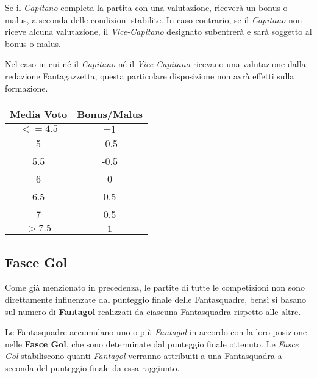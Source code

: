 \documentclass[12pt]{article}
\begin{document}
Se il \textit{Capitano} completa la partita con una valutazione, riceverà un bonus o malus, a seconda delle condizioni stabilite. In caso contrario, se il \textit{Capitano} non riceve alcuna valutazione, il \textit{Vice-Capitano} designato subentrerà e sarà soggetto al bonus o malus.

Nel caso in cui né il \textit{Capitano} né il \textit{Vice-Capitano} ricevano una valutazione dalla redazione Fantagazzetta, questa particolare disposizione non avrà effetti sulla formazione.
\newline
\\
\begin{tabular}{|c|c|}
    \hline
    \textbf{Media Voto} & \textbf{Bonus/Malus} \\
    \hline
    $ <= 4.5 $ & $ -1 $ \\
    \hline
    5 & -0.5 \\
    \hline
    5.5 & -0.5 \\
    \hline
    6 & 0 \\
    \hline
    6.5 & 0.5 \\
    \hline
    7 & 0.5 \\
    \hline
    $ > 7.5 $ & $ 1 $ \\
    \hline
  \end{tabular}
\newline 

\subsection{Fasce Gol}
Come già menzionato in precedenza, le partite di tutte le competizioni non sono direttamente influenzate dal punteggio finale delle Fantasquadre, bensì si basano sul numero di \textbf{Fantagol} realizzati da ciascuna Fantasquadra rispetto alle altre.

Le Fantasquadre accumulano uno o più \textit{Fantagol} in accordo con la loro posizione nelle \textbf{Fasce Gol}, che sono determinate dal punteggio finale ottenuto. Le \textit{Fasce Gol} stabiliscono quanti \textit{Fantagol} verranno attribuiti a una Fantasquadra a seconda del punteggio finale da essa raggiunto.
\end{document}
